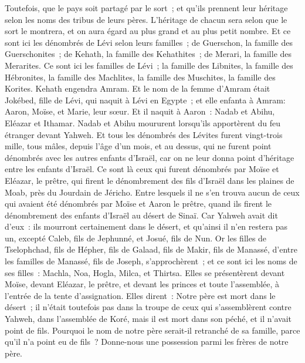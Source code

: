 \begin{multicols}{2}
Toutefois, que le pays soit partagé par le sort~; et qu'ils prennent leur héritage selon les noms des tribus de leurs pères.
L'héritage de chacun sera selon que le sort le montrera, et on aura égard au plus grand et au plus petit nombre.
Et ce sont ici les dénombrés de Lévi selon leurs familles~; de Guerschon, la famille des Guerschonites~; de Kehath, la famille des Kehathites~; de Merari, la famille des Merarites.
Ce sont ici les familles de Lévi~; la famille des Libnites, la famille des Hébronites, la famille des Machlites, la famille des Muschites, la famille des Korites. Kehath engendra Amram.
Et le nom de la femme d'Amram était Jokébed, fille de Lévi, qui naquit à Lévi en Egypte~; et elle enfanta à Amram: Aaron, Moïse, et Marie, leur sœur.
Et il naquit à Aaron~: Nadab et Abihu, Eléazar et Ithamar.
Nadab et Abihu moururent lorsqu'ils apportèrent du feu étranger devant Yahweh.
Et tous les dénombrés des Lévites furent vingt-trois mille, tous mâles, depuis l'âge d'un mois, et au dessus, qui ne furent point dénombrés avec les autres enfants d'Israël, car on ne leur donna point d'héritage entre les enfants d'Israël.
Ce sont là ceux qui furent dénombrés par Moïse et Eléazar, le prêtre, qui firent le dénombrement des fils d'Israël dans les plaines de Moab, près du Jourdain de Jéricho.
Entre lesquels il ne s'en trouva aucun de ceux qui avaient été dénombrés par Moïse et Aaron le prêtre, quand ils firent le dénombrement des enfants d'Israël au désert de Sinaï.
Car Yahweh avait dit d'eux~: ils mourront certainement dans le désert, et qu'ainsi il n'en restera pas un, excepté Caleb, fils de Jephunné, et Josué, fils de Nun.
\VerseOne{}Or les filles de Tselophchad, fils de Hépher, fils de Galaad, fils de Makir, fils de Manassé, d'entre les familles de Manassé, fils de Joseph, s'approchèrent~; et ce sont ici les noms de ses filles~: Machla, Noa, Hogla, Milca, et Thirtsa.
Elles se présentèrent devant Moïse, devant Eléazar, le prêtre, et devant les princes et toute l'assemblée, à l'entrée de la tente d'assignation. Elles dirent~:
Notre père est mort dans le désert~; il n'était toutefois pas dans la troupe de ceux qui s'assemblèrent contre Yahweh, dans l'assemblée de Koré, mais il est mort dans son péché, et il n'avait point de fils.
Pourquoi le nom de notre père serait-il retranché de sa famille, parce qu'il n'a point eu de fils~? Donne-nous une possession parmi les frères de notre père.

\end{multicols}
